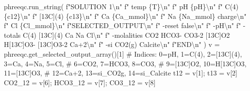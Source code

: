 \documentclass[
  letterpaper,
  DIV=11,
  numbers=noendperiod]{scrartcl}
\newenvironment{Shaded}{\begin{snugshade}}{\end{snugshade}}
\newcommand{\CharTok}[1]{\textcolor[rgb]{0.13,0.47,0.30}{#1}}
\newcommand{\CommentTok}[1]{\textcolor[rgb]{0.37,0.37,0.37}{#1}}
\newcommand{\DecValTok}[1]{\textcolor[rgb]{0.68,0.00,0.00}{#1}}
\newcommand{\NormalTok}[1]{\textcolor[rgb]{0.00,0.23,0.31}{#1}}
\newcommand{\OperatorTok}[1]{\textcolor[rgb]{0.37,0.37,0.37}{#1}}
\newcommand{\SpecialCharTok}[1]{\textcolor[rgb]{0.37,0.37,0.37}{#1}}
\newcommand{\SpecialStringTok}[1]{\textcolor[rgb]{0.13,0.47,0.30}{#1}}
\begin{document}
\begin{Shaded}
\begin{Highlighting}[]
\NormalTok{    phreeqc.run\_string(}
        \SpecialStringTok{f"SOLUTION 1}\CharTok{\textbackslash{}n}\SpecialStringTok{"}
        \SpecialStringTok{f"    temp }\SpecialCharTok{\{}\NormalTok{T}\SpecialCharTok{\}}\CharTok{\textbackslash{}n}\SpecialStringTok{"}
        \SpecialStringTok{f"    pH }\SpecialCharTok{\{}\NormalTok{pH}\SpecialCharTok{\}}\CharTok{\textbackslash{}n}\SpecialStringTok{"}
        \SpecialStringTok{f"    C(4) }\SpecialCharTok{\{}\NormalTok{c12}\SpecialCharTok{\}}\CharTok{\textbackslash{}n}\SpecialStringTok{"}
        \SpecialStringTok{f"    [13C](4) }\SpecialCharTok{\{}\NormalTok{c13}\SpecialCharTok{\}}\CharTok{\textbackslash{}n}\SpecialStringTok{"}
        \SpecialStringTok{f"    Ca }\SpecialCharTok{\{}\NormalTok{Ca\_mmol}\SpecialCharTok{\}}\CharTok{\textbackslash{}n}\SpecialStringTok{"}
        \SpecialStringTok{f"    Na }\SpecialCharTok{\{}\NormalTok{Na\_mmol}\SpecialCharTok{\}}\SpecialStringTok{ charge}\CharTok{\textbackslash{}n}\SpecialStringTok{"}
        \SpecialStringTok{f"    Cl }\SpecialCharTok{\{}\NormalTok{Cl\_mmol}\SpecialCharTok{\}}\CharTok{\textbackslash{}n}\SpecialStringTok{"}
        \SpecialStringTok{f"SELECTED\_OUTPUT}\CharTok{\textbackslash{}n}\SpecialStringTok{"}
        \SpecialStringTok{f"    {-}reset false}\CharTok{\textbackslash{}n}\SpecialStringTok{"}
        \SpecialStringTok{f"    {-}pH}\CharTok{\textbackslash{}n}\SpecialStringTok{"}
        \SpecialStringTok{f"    {-}totals C(4) [13C](4) Ca Na Cl}\CharTok{\textbackslash{}n}\SpecialStringTok{"}
        \SpecialStringTok{f"    {-}molalities CO2 HCO3{-} CO3{-}2 [13C]O2 H[13C]O3{-} [13C]O3{-}2 Ca+2}\CharTok{\textbackslash{}n}\SpecialStringTok{"}
        \SpecialStringTok{f"    {-}si CO2(g) Calcite}\CharTok{\textbackslash{}n}\SpecialStringTok{"}
        \SpecialStringTok{f"END}\CharTok{\textbackslash{}n}\SpecialStringTok{"}
\NormalTok{    )}
\NormalTok{    v }\OperatorTok{=}\NormalTok{ phreeqc.get\_selected\_output\_array()[}\DecValTok{1}\NormalTok{]}
    \CommentTok{\# Indices: 0=pH, 1=C(4), 2=[13C](4), 3=Ca, 4=Na, 5=Cl,}
    \CommentTok{\#          6=CO2, 7=HCO3, 8=CO3,}
    \CommentTok{\#          9=[13C]O2, 10=H[13C]O3, 11=[13C]O3,}
    \CommentTok{\#          12=Ca+2, 13=si\_CO2g, 14=si\_Calcite}
\NormalTok{    t12 }\OperatorTok{=}\NormalTok{ v[}\DecValTok{1}\NormalTok{]}\OperatorTok{;}\NormalTok{ t13 }\OperatorTok{=}\NormalTok{ v[}\DecValTok{2}\NormalTok{]}
\NormalTok{    CO2\_12 }\OperatorTok{=}\NormalTok{ v[}\DecValTok{6}\NormalTok{]}\OperatorTok{;}\NormalTok{ HCO3\_12 }\OperatorTok{=}\NormalTok{ v[}\DecValTok{7}\NormalTok{]}\OperatorTok{;}\NormalTok{ CO3\_12 }\OperatorTok{=}\NormalTok{ v[}\DecValTok{8}\NormalTok{]}

\end{Highlighting}
\end{Shaded}
\end{document}
